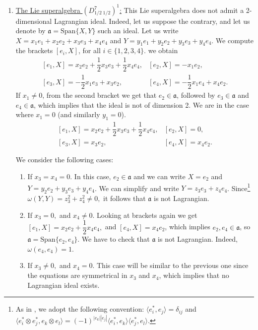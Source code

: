 \documentclass[12pt]{amsart}
\begin{document}
\begin{enumerate}
    \item \underline{The Lie superalgebra $(D^{7}_{1/2\; 1/2})^1$:} This Lie superalgebra does not admit a 2-dimensional Lagrangian ideal. Indeed, let us suppose the contrary, and let us  denote by $\mathfrak{a}=\mathrm{Span}\{X,Y\}$ such an ideal. Let us write $X=x_1e_1+x_2e_2+x_3e_3+x_4e_4$ and $Y=y_1e_1+y_2e_2+y_3e_3+y_4e_4$. 
    We compute the brackets  $[e_i,X]$,  for all $i\in \{1,2,3,4\}$. we obtain 
    \[ 
    \begin{array}{ll}
    [e_1, X]=x_2e_2 + \dfrac{1}{2}x_3 e_3+ \dfrac{1}{2}x_4 e_4, &  [e_2, X]=-x_1e_2,\\[2mm]
    [e_3,X]=-\dfrac{1}{2}x_1 e_3+x_3 e_2, & [e_4, X]=-\dfrac{1}{2}x_1 e_4+x_4 e_2.
    \end{array}
    \]
    If $x_1 \neq 0 $, from the second bracket we get that $e_2 \in \mathfrak{a}$, followed by $e_3 \in \mathfrak{a}$ and $e_4 \in \mathfrak{a}$, which implies that the ideal is not of dimension 2. We are in the case where $x_1=0$ (and similarly $y_1=0$).
    \[
    \begin{array}{ll}
    [e_1, X]=x_2e_2 + \dfrac{1}{2}x_3 e_3+ \dfrac{1}{2}x_4 e_4, &  [e_2, X]=0,\\[2mm]
    [e_3,X]=x_3 e_2, & [e_4, X]=x_4 e_2.
    \end{array}
    \]
    
    We consider the following cases:
    \begin{enumerate}
        \item If $x_3=x_4=0$. In this case,  $e_2 \in \mathfrak{a}$ and we can write $X=e_2$ and $Y=y_2e_2+y_3e_3+y_4e_4$. We  can simplify and write $Y=z_3e_3+z_4e_4$. Since\footnote{As in \cite{BM, BEM, BE}, we adopt the following convention: $\langle e_i^*, e_j\rangle=\delta_{ij}$ and  $\langle e_i^*\otimes e_j^*, e_k\otimes e_l\rangle= (-1)^{|e_k||e_j|} \langle e_i^*, e_k \rangle \langle e_j^*, e_l \rangle$.} $\omega(Y,Y)=z_3^2+z_4^2\not =0,$ it follows that $\mathfrak{a}$ is not Lagrangian. 
        
        \item If $x_3=0,$ and $ x_4\neq 0$.  Looking at brackets again we get $[e_1, X]=x_2e_2 + \dfrac{1}{2}x_4 e_4,$ and $ [e_4, X]=x_4 e_2$, which implies $e_2, e_4 \in \mathfrak{a}$, so $\mathfrak{a}=\mathrm{Span}\{ e_2, e_4\} $. We have to check that $\mathfrak{a}$ is not Lagrangian. Indeed, $\omega(e_4, e_4)=1$.
        
        \item If $x_3 \neq 0,$ and $ x_4= 0$. This case will be  similar to the previous one since the equations are symmetrical in $x_3$ and $x_4$, which implies that no Lagrangian ideal exists.  
        

\end{enumerate}
\end{enumerate}
\end{document}
